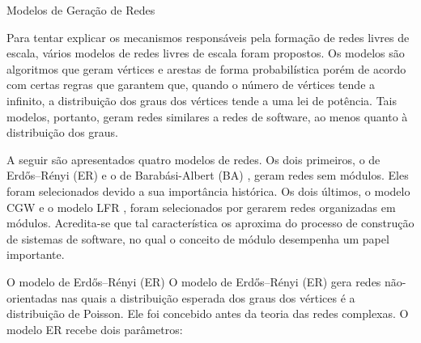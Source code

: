 \begin{section}{Modelos de Geração de Redes}

Para tentar explicar os mecanismos responsáveis pela formação de redes livres de escala, vários modelos de redes livres de escala foram propostos. Os modelos são algoritmos que geram vértices e arestas de forma probabilística porém de acordo com certas regras que garantem que, quando o número de vértices tende a infinito, a distribuição dos graus dos vértices tende a uma lei de potência. Tais modelos, portanto, geram redes similares a redes de software, ao menos quanto à distribuição dos graus.

A seguir são apresentados quatro modelos de redes. Os dois primeiros, o de Erdős–Rényi (ER) \cite{Erdos1959} e o de Barabási-Albert (BA) \cite{Barabasi1999}, geram redes sem módulos. Eles foram selecionados devido a sua importância histórica. Os dois últimos, o modelo CGW \cite{Chen2008} e o modelo LFR \cite{Lancichinetti2008,Lancichinetti2009}, foram selecionados por gerarem redes organizadas em módulos. Acredita-se que tal característica os aproxima do processo de construção de sistemas de software, no qual o conceito de módulo desempenha um papel importante.



% 

 

\begin{subsection}{O modelo de Erdős–Rényi (ER)}
	O modelo de Erdős–Rényi (ER) \cite{Erdos1959} gera redes não-orientadas nas quais a distribuição esperada dos graus dos vértices é a distribuição de Poisson. Ele foi concebido antes da teoria das redes complexas. O modelo ER recebe dois parâmetros:
	

\end{subsection}
\end{section}
